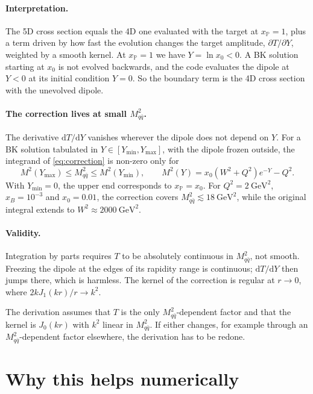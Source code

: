 \documentclass[11pt,a4paper]{article}
\newcommand{\Mqq}{M_{q\bar q}^2}
\newcommand{\dd}{\mathrm{d}}
\newcommand{\xP}{x_{\mathbb{P}}}
\begin{document}
\paragraph{Interpretation.}
The 5D cross section equals the 4D one evaluated with the target at $\xP = 1$,
plus a term driven by how fast the evolution changes the target amplitude,
$\partial T / \partial Y$, weighted by a smooth kernel. At $\xP = 1$ we have
$Y = \ln x_0 < 0$. A BK solution starting at $x_0$ is not evolved backwards,
and the code evaluates the dipole at $Y < 0$ at its initial condition $Y = 0$.
So the boundary term is the 4D cross section with the unevolved dipole.

\paragraph{The correction lives at small $\Mqq$.}
The derivative $\dd T / \dd Y$ vanishes wherever the dipole does not depend on
$Y$. For a BK solution tabulated in $Y \in [Y_{\min}, Y_{\max}]$, with the
dipole frozen outside, the integrand of \eqref{eq:correction} is non-zero only
for
\begin{equation}
  M^2(Y_{\max}) \leq \Mqq \leq M^2(Y_{\min}) ,
  \qquad
  M^2(Y) = x_0 \left(W^2 + Q^2\right) e^{-Y} - Q^2 .
\end{equation}
With $Y_{\min} = 0$, the upper end corresponds to $\xP = x_0$. For
$Q^2 = 2\ \text{GeV}^2$, $x_B = 10^{-3}$ and $x_0 = 0.01$, the correction
covers $\Mqq \lesssim 18\ \text{GeV}^2$, while the original integral extends
to $W^2 \approx 2000\ \text{GeV}^2$.

\paragraph{Validity.}
Integration by parts requires $T$ to be absolutely continuous in $\Mqq$, not
smooth. Freezing the dipole at the edges of its rapidity range is continuous;
$\dd T / \dd Y$ then jumps there, which is harmless. The kernel of the
correction is regular at $r \to 0$, where $2kJ_1(kr)/r \to k^2$.

The derivation assumes that $T$ is the only $\Mqq$-dependent factor and that
the kernel is $J_0(kr)$ with $k^2$ linear in $\Mqq$. If either changes, for
example through an $\Mqq$-dependent factor elsewhere, the derivation has to be
redone.

\section{Why this helps numerically}
\end{document}
